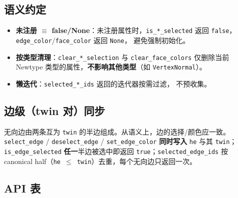 \documentclass[11pt,a4paper]{article}
\begin{document}
\subsection{语义约定}

\begin{itemize}
  \item \textbf{未注册 $\equiv$ false/None}：未注册属性时，\texttt{is\_*\_selected}
        返回 \texttt{false}，\texttt{edge\_color}/\texttt{face\_color} 返回 \texttt{None}，
        避免强制初始化。
  \item \textbf{按类型清理}：\texttt{clear\_*\_selection} 与 \texttt{clear\_face\_colors}
        仅删除当前 Newtype 类型的属性，\textbf{不影响其他类型}（如 \texttt{VertexNormal}）。
  \item \textbf{懒迭代}：\texttt{selected\_*\_ids} 返回的迭代器按需过滤，
        不预收集。
\end{itemize}

\subsection{边级（twin 对）同步}

\begin{sloppypar}
无向边由两条互为 \texttt{twin} 的半边组成。从语义上，边的选择/颜色应一致。
\texttt{select\_edge} / \texttt{deselect\_edge} / \texttt{set\_edge\_color}
\textbf{同时写入} \texttt{he} 与其 \texttt{twin}；\texttt{is\_edge\_selected}
\textbf{任一}半边被选中即返回 \texttt{true}；\texttt{selected\_edge\_ids}
按 canonical half（\texttt{he $\le$ twin}）去重，每个无向边只返回一次。
\end{sloppypar}

\begin{center}
\end{center}

\subsection{API 表}
\end{document}
